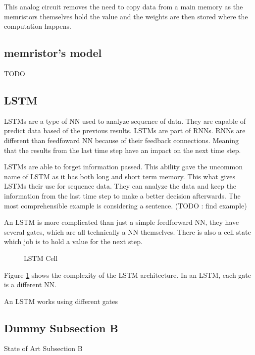This analog circuit removes the need to copy data from a main memory as the memristors themselves hold the value and the weights are then stored where the computation happens.

\subsection{memristor's model}
TODO
\subsection{LSTM}
\acp{LSTM} are a type of \ac{NN} used to analyze sequence of data. They are capable of predict data based of the previous results. \acp{LSTM} are part of \acp{RNN}. \acp{RNN} are different than feedfoward \acl{NN} because of their feedback connections. Meaning that the results from the last time step have an impact on the next time step. 

\acp{LSTM} are able to forget information passed. This ability gave the uncommon name of \acl{LSTM} as it has both long and short term memory. This what gives \acp{LSTM} their use for sequence data. They can analyze the data and keep the information from the last time step to make a better decision afterwards. The most comprehensible example is considering a sentence. (TODO : find example)

An \ac{LSTM} is more complicated than just a simple feedforward \acl{NN}, they have several gates, which are all technically a \ac{NN} themselves. There is also a cell state which job is to hold a value for the next step.

\begin{figure}[H]
    \centering
    
    \caption{LSTM Cell}
    \label{fig:lstmCell}
\end{figure}

Figure \ref{fig:lstmCell} shows the complexity of the \ac{LSTM} architecture. In an \ac{LSTM}, each gate is a different \ac{NN}. 

An \ac{LSTM} works using different gates
\subsection{Dummy Subsection B}
\label{subsec:subsectionb}

State of Art Subsection B

